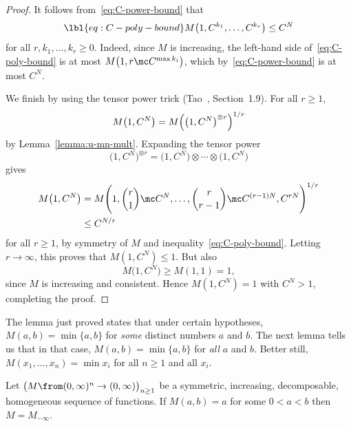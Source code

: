 \begin{proof}
It follows from~\eqref{eq:C-power-bound} that
% 
\begin{equation}
\lbl{eq:C-poly-bound}
M\bigl(1, C^{k_1}, \ldots, C^{k_r}\bigr) \leq C^N
\end{equation}
% 
for all $r, k_1, \ldots, k_r \geq 0$.  Indeed, since $M$ is increasing, the
left-hand side of~\eqref{eq:C-poly-bound} is at most $M\bigl(1, r \mc
C^{\max k_i}\bigr)$, which by~\eqref{eq:C-power-bound} is at most $C^N$.

We finish by using the tensor%
%
% 
power trick (Tao~\cite{TaoSR}, Section~1.9).  For all $r \geq 1$,
\[
M\bigl(1, C^N\bigr) 
=
M\Bigl( \bigl(1, C^N\bigr)^{\otimes r} \Bigr)^{1/r}
\]
by Lemma~\ref{lemma:u-mn-mult}.  Expanding the tensor power 
\[
\bigl(1, C^N\bigr)^{\otimes r} 
=
\bigl(1, C^N\bigr) \otimes \cdots \otimes \bigl(1, C^N\bigr)
\]
gives 
% 
\begin{align*}
M\bigl(1, C^N\bigr)       &
=
M\Biggl( 
1, \binom{r}{1} \mc C^N, \ldots, \binom{r}{r - 1} \mc C^{(r - 1)N}, C^{rN}
\Biggr)^{1/r}   \\
&
\leq
C^{N/r}
\end{align*}
% 
for all $r \geq 1$, by symmetry of $M$ and
inequality~\eqref{eq:C-poly-bound}.  Letting $r \to \infty$, this proves
that $M(1, C^N) \leq 1$.  But also
\[
M\bigl(1, C^N\bigr) \geq M(1, 1) = 1,
\]
since $M$ is increasing and consistent.  Hence $M(1, C^N) = 1$ with $C^N >
1$, completing the proof.
\end{proof}

The lemma just proved states that under certain hypotheses, $M(a, b) =
\min\{a, b\}$ for \emph{some} distinct numbers $a$ and $b$.  The next lemma
tells us that in that case, $M(a, b) = \min\{a, b\}$ for
\emph{all} $a$ and $b$. Better still, $M(x_1, \ldots, x_n) = \min x_i$ for
all $n \geq 1$ and all $x_i$.

\begin{lemma}
Let $\bigl(M \from (0, \infty)^n \to (0, \infty)\bigr)_{n \geq 1}$ be a
symmetric, increasing, decomposable, homogeneous sequence of functions.  If
$M(a, b) = a$ for some $0 < a < b$ then $M = M_{-\infty}$.
\end{lemma}

